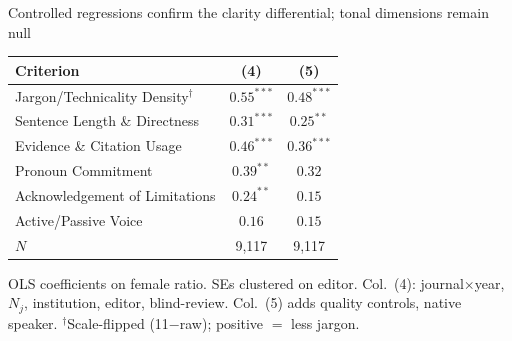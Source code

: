 \documentclass[aspectratio=169,11pt]{beamer}
\begin{document}
\begin{frame}{Controlled regressions confirm the clarity differential; tonal dimensions remain null}
    \vfill
    \begin{center}
    {\small
    \begin{tabular}{lcc}
        \toprule
        Criterion & (4) & (5) \\
        \midrule
        Jargon/Technicality Density$^{\dagger}$ & $0.55^{***}$ & $0.48^{***}$ \\
        Sentence Length \& Directness           & $0.31^{***}$ & $0.25^{**}$  \\
        Evidence \& Citation Usage              & $0.46^{***}$ & $0.36^{***}$ \\
        Pronoun Commitment                       & $0.39^{**}$  & $0.32$       \\
        Acknowledgement of Limitations          & $0.24^{**}$  & $0.15$       \\
        Active/Passive Voice                     & $0.16$       & $0.15$       \\
        \midrule
        $N$                                      & 9,117        & 9,117        \\
        \bottomrule
    \end{tabular}
    }
    \end{center}
    \vspace{0.2cm}
    \begin{center}
        {\small\color{WarmGray}
        OLS coefficients on female ratio. SEs clustered on editor.
        Col.~(4): journal$\times$year, $N_j$, institution, editor, blind-review.
        Col.~(5) adds quality controls, native speaker.
        $^{\dagger}$Scale-flipped (11$-$raw); positive $=$ less jargon.}
    \end{center}
    \vfill
\end{frame}
\end{document}
